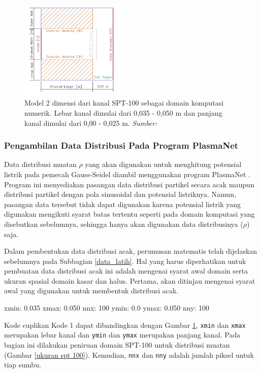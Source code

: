 \begin{figure}[h!]
    \centering
    \includegraphics[width=5cm]{gambar/spt_100_2d.png}
    \caption{Model 2 dimensi dari kanal SPT-100 sebagai domain komputasi numerik. Lebar kanal dimulai dari 0,035 - 0,050 m dan panjang kanal dimulai dari 0,00 - 0,025 m. \emph{ Sumber: \citep{braga_miranda_2019}}}
    \label{spt_100_2d}
\end{figure}

\subsubsection{Pengambilan Data Distribusi Pada Program PlasmaNet}

Data distribusi muatan $\rho$ yang akan digunakan untuk menghitung potensial listrik pada pemecah Gauss-Seidel diambil menggunakan program PlasmaNet \citep{cheng_illarramendi_bauerheim_cuenot_2021}. Program ini menyediakan pasangan data distribusi partikel secara acak maupun distribusi partikel dengan pola sinusoidal dan potensial listriknya. Namun, pasangan data tersebut tidak dapat digunakan karena potensial listrik yang digunakan mengikuti syarat batas tertentu seperti pada domain komputasi yang disebutkan sebelumnya, sehingga hanya akan digunakan data distribusinya ($\rho$) saja.

Dalam pembentukan data distribusi acak, perumusan matematis telah dijelaskan sebelumnya pada Subbagian \ref{data_latih}. Hal yang harus diperhatikan untuk pembuatan data distribusi acak ini adalah mengenai syarat awal domain serta ukuran spasial domain kasar dan halus. Pertama, akan ditinjau mengenai syarat awal yang digunakan untuk membentuk distribusi acak. 

\begin{mypythoncode}
xmin: 0.035
xmax: 0.050
nnx: 100   
ymin: 0.0  
ymax: 0.050
nny: 100   

\end{mypythoncode}

Kode cuplikan Kode 1 dapat dibandingkan dengan Gambar \ref{spt_100_2d}, \texttt{xmin} dan \texttt{xmax} merupakan lebar kanal dan \texttt{ymin} dan \texttt{ymax} merupakan panjang kanal. Pada bagian ini dilakukan peniruan domain SPT-100 untuk distribusi muatan (Gambar \ref{ukuran spt 100}). Kemudian, \texttt{nnx} dan \texttt{nny} adalah jumlah piksel untuk tiap sumbu.

